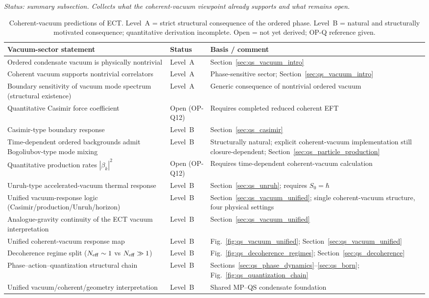 \textit{Status: summary subsection.
Collects what the coherent-vacuum viewpoint already supports and what
remains open.}

\begin{table}[h]
\caption{Coherent-vacuum predictions of ECT.
Level~A = strict structural consequence of the ordered phase.
Level~B = natural and structurally motivated consequence; quantitative
derivation incomplete.
Open = not yet derived; OP-Q reference given.}
\label{tab:qs_vacuum}
\centering\small
\renewcommand{\arraystretch}{1.35}
\begin{tabular}{p{6.0cm}p{2.4cm}p{4.5cm}}
\hline\hline
Vacuum-sector statement & Status & Basis / comment \\
\hline
Ordered condensate vacuum is physically nontrivial
  & Level~A
  & Section~\ref{sec:qs_vacuum_intro} \\
Coherent vacuum supports nontrivial correlators
  & Level~A
  & Phase-sensitive sector; Section~\ref{sec:qs_vacuum_intro} \\
Boundary sensitivity of vacuum mode spectrum
  (structural existence)
  & Level~A
  & Generic consequence of nontrivial ordered vacuum \\
Quantitative Casimir force coefficient
  & Open (OP-Q12)
  & Requires completed reduced coherent EFT \\
Casimir-type boundary response
  & Level~B
  & Section~\ref{sec:qs_casimir} \\
Time-dependent ordered backgrounds admit Bogoliubov-type mode mixing
  & Level~B
  & Structurally natural; explicit coherent-vacuum
    implementation still closure-dependent;
    Section~\ref{sec:qs_particle_production} \\
Quantitative production rates $|\beta_k|^2$
  & Open (OP-Q12)
  & Requires time-dependent coherent-vacuum calculation \\
Unruh-type accelerated-vacuum thermal response
  & Level~B
  & Section~\ref{sec:qs_unruh}; requires $S_0=\hbar$ \\
Unified vacuum-response logic (Casimir/production/Unruh/horizon)
  & Level~B
  & Section~\ref{sec:qs_vacuum_unified};
    single coherent-vacuum structure, four physical settings \\
Analogue-gravity continuity of the ECT vacuum interpretation
  & Level~B
  & Section~\ref{sec:qs_vacuum_unified} \\
Unified coherent-vacuum response map
  & Level~B
  & Fig.~\ref{fig:qs_vacuum_unified};
    Section~\ref{sec:qs_vacuum_unified} \\
Decoherence regime split ($N_{\rm eff}\sim1$ vs $N_{\rm eff}\gg1$)
  & Level~B
  & Fig.~\ref{fig:qs_decoherence_regimes};
    Section~\ref{sec:qs_decoherence} \\
Phase--action--quantization structural chain
  & Level~B
  & Sections~\ref{sec:qs_phase_dynamics}--\ref{sec:qs_born};
    Fig.~\ref{fig:qs_quantization_chain} \\
Unified vacuum/coherent/geometry interpretation
  & Level~B
  & Shared MP--QS condensate foundation \\
\hline\hline
\end{tabular}
\end{table}


